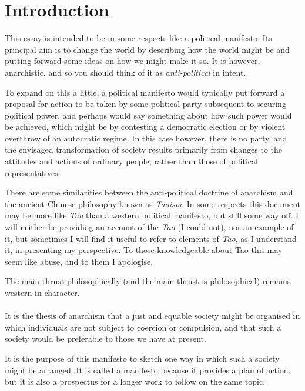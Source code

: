 
\section{Introduction}\label{Introduction}

This essay is intended to be in some respects like a political manifesto.
Its principal aim is to change the world by describing how the world might be and putting forward some ideas on how we might make it so.
It is however, anarchistic, and so you should think of it as {\it anti-political} in intent.

To expand on this a little, a political manifesto would typically put forward a proposal for action to be taken by some political party subsequent to securing political power, and perhaps would say something about how such power would be achieved, which might be by contesting a democratic election or by violent overthrow of an autocratic regime.
In this case however, there is no party, and the envisaged transformation of society results primarily from changes to the attitudes and actions of ordinary people, rather than those of political representatives.

There are some similarities between the anti-political doctrine of anarchism and the ancient Chinese philosophy known as {\it Taoism}.
In some respects this document may be more like {\it Tao} than a western political manifesto, but still some way off.
I will neither be providing an account of the {\it Tao} (I could not), nor an example of it, but sometimes I will find it useful to refer to elements of {\it Tao}, as I understand it, in presenting my perspective.
To those knowledgeable about Tao this may seem like abuse, and to them I apologise.

The main thrust philosophically (and the main thrust is philosophical) remains western in character. 

\paragraph{}

It is the thesis of anarchism that a just and equable society might be organised in which individuals are not subject to coercion or compulsion, and that such a society would be preferable to those we have at present.

It is the purpose of this manifesto to sketch one way in which such a society might be arranged.
It is called a manifesto because it provides a plan of action, but it is also a prospectus for a longer work to follow on the same topic.

